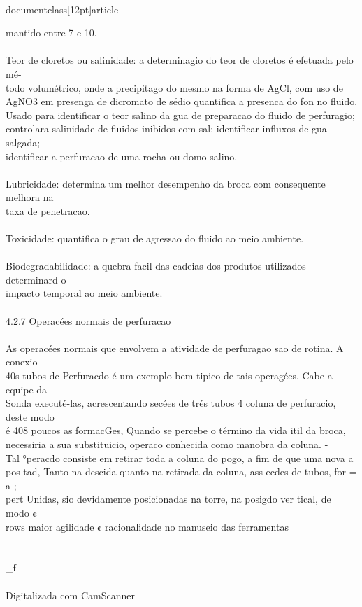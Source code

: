 \\documentclass[12pt]{article}
\begin{document}
mantido entre 7 e 10.\\
\\
Teor de cloretos ou salinidade: a determinagio do teor de cloretos é efetuada pelo mé-\\
todo volumétrico, onde a precipitago do mesmo na forma de AgCl, com uso de\\
AgNO3 em presenga de dicromato de sédio quantifica a presenca do fon no fluido.\\
Usado para identificar o teor salino da gua de preparacao do fluido de perfuragio;\\
controlara salinidade de fluidos inibidos com sal; identificar influxos de gua salgada;\\
identificar a perfuracao de uma rocha ou domo salino.\\
\\
Lubricidade: determina um melhor desempenho da broca com consequente melhora na\\
taxa de penetracao.\\
\\
Toxicidade: quantifica o grau de agressao do fluido ao meio ambiente.\\
\\
Biodegradabilidade: a quebra facil das cadeias dos produtos utilizados determinard o\\
impacto temporal ao meio ambiente.\\
\\
4.2.7 Operacées normais de perfuracao\\
\\
As operacées normais que envolvem a atividade de perfuragao sao de rotina. A conexio\\
40s tubos de Perfuracdo é um exemplo bem tipico de tais operagées. Cabe a equipe da\\
Sonda executé-las, acrescentando secées de trés tubos 4 coluna de perfuracio, deste modo\\
é 408 poucos as formacGes, Quando se percebe o término da vida itil da broca,\\
necessiria a sua substituicio, operaco conhecida como manobra da coluna. -\\
Tal °peracdo consiste em retirar toda a coluna do pogo, a fim de que uma nova a\\
pos tad, Tanto na descida quanto na retirada da coluna, ass ecdes de tubos, for = a ;\\
pert Unidas, sio devidamente posicionadas na torre, na posigdo ver tical, de modo ¢\\
rows maior agilidade ¢ racionalidade no manuseio das ferramentas\\
\\
\\_f\\
\\
Digitalizada com CamScanner\\
\end{document}
